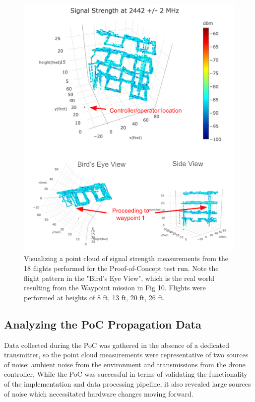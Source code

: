 \documentclass[pageno]{jpaper}
\begin{document}
\begin{figure}[!h]
 	\caption{Visualizing a point cloud of signal strength measurements from the 18 flights performed for the Proof-of-Concept test run. Note the flight pattern in the "Bird's Eye View", which is the real world  resulting from the Waypoint mission in Fig 10. Flights were performed at heights of 8 ft, 13 ft, 20 ft, 26 ft.}
 	\includegraphics{PoC_1}
 	\centering
\end{figure}

\subsection{Analyzing the PoC Propagation Data}
Data collected during the PoC was gathered in the absence of a dedicated transmitter, so the point cloud measurements were representative of two sources of noise: ambient noise from the environment and transmissions from the drone controller. While the PoC was successful in terms of validating the functionality of the implementation and data processing pipeline, it also revealed large sources of noise which necessitated hardware changes moving forward.
\end{document}
